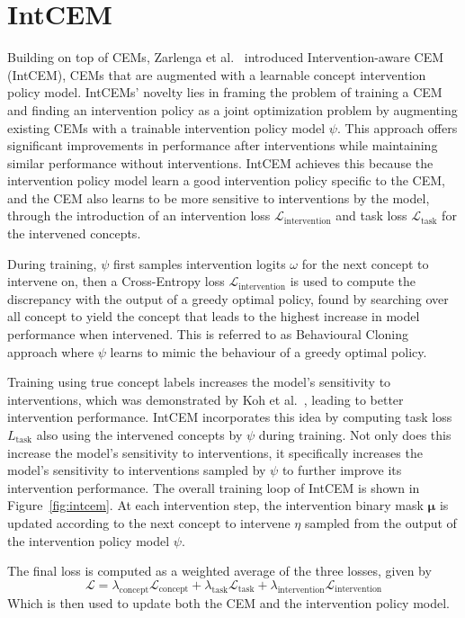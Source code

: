 \section{IntCEM} %

Building on top of CEMs, Zarlenga et al.~\cite{intcem} introduced 
Intervention-aware CEM (IntCEM), CEMs that are augmented
with a learnable concept intervention policy model. IntCEMs' novelty
lies in framing the problem of training a CEM and finding
an intervention policy as a joint optimization problem by augmenting
existing CEMs with a trainable intervention policy model $\psi$. 
This approach offers significant improvements in performance after 
interventions while maintaining similar performance without 
interventions. 
IntCEM achieves this because the intervention policy model
learn a good intervention policy specific to the CEM, 
and the CEM also learns to be more sensitive to interventions
by the model, through the introduction of an intervention loss 
$\mathcal{L}_{\text{intervention}}$ and task loss $\mathcal{L}_{\text{task}}$ for 
the intervened concepts.

During training, $\psi$ first samples intervention
logits $\omega$ for the next concept to intervene on, then 
a Cross-Entropy loss $\mathcal{L}_{\text{intervention}}$ is used to
compute the discrepancy with the output of a greedy 
optimal policy, found by searching over all concept to
yield the concept that leads to the highest increase
in model performance when intervened. This is referred to as Behavioural
Cloning~\cite{behavioural-cloning} approach where $\psi$ learns to mimic the behaviour of
a greedy optimal policy.

Training using
true concept labels increases the model's sensitivity
to interventions, which was 
demonstrated by Koh et al.~\cite{cbm},
leading to better intervention performance.
IntCEM incorporates this idea by computing task loss $L_{\text{task}}$ also
using the intervened concepts by $\psi$ during training.
Not only does this increase the model's sensitivity to interventions,
it specifically increases the model's sensitivity to interventions
sampled by $\psi$ to further improve its intervention performance.
The overall training loop of IntCEM 
is shown in Figure~\ref{fig:intcem}. At each intervention step,
the intervention binary mask $\bm{\mu}$ is updated according to 
the next concept to intervene $\eta$ sampled from 
the output of the intervention policy model $\psi$.

The final loss is computed as a weighted average of the three losses,
given by 
\[\mathcal{L} = \lambda_{\text{concept}} \mathcal{L}_{\text{concept}}
+  \lambda_{\text{task}} \mathcal{L}_{\text{task}}
+  \lambda_{\text{intervention}} \mathcal{L}_{\text{intervention}}\]
Which is then used to update both the CEM and the intervention policy model.

